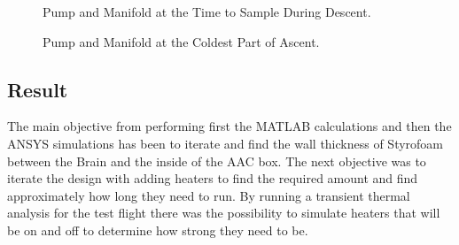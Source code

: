 \begin{figure}[H]
    \centering
    \hifll
    \caption{\color{blue}Pump and Manifold at the Time to Sample During Descent.}
    \label{fig:Pump-Valve-ascent-sample-descent}
\end{figure}

\begin{figure}[H]
    \centering
    \hifll
    \caption{\color{blue}Pump and Manifold at the Coldest Part of Ascent.}
    \label{fig:Pump-Valve-ascent-critical-lowest}
\end{figure}

\subsection{Result}
The main objective from performing first the MATLAB calculations and then the ANSYS simulations has been to iterate and find the wall thickness of Styrofoam between the Brain and the inside of the AAC box. The next objective was to iterate the design with adding heaters to find the required amount and find approximately how long they need to run. By running a transient thermal analysis for the test flight there was the possibility to simulate heaters that will be on and off to determine how strong they need to be.

